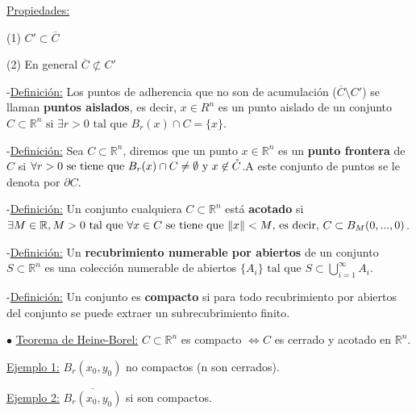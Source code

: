\documentclass[10pt, titlepage]{article}
\newcommand{\R}{\mathbb{R}}
\newcommand{\definicion}{\noindent-\underline{Definición:} }
\newcommand{\teorema}[1][\!\!]{\noindent$\bullet$ \underline{Teorema #1:} }
\begin{document}
\underline{Propiedades:}
\vspace{3mm}

\indent \indent (1) $C' \subset \overline{C}$
\vspace{3mm}

\indent \indent (2) En general $\overline{C} \not\subset C'$
\vspace{5mm}

\definicion Los puntos de adherencia que no son de acumulación ($\overline{C} \setminus C'$) se llaman 
\textbf{puntos aislados}, es decir, $x \in R^n$ es un punto aislado de un conjunto$ C \subset \R^n 
\text{ si } \exists{r > 0} \text{ tal que } B_r (x) \cap C = \{x\}$.
\vspace{7mm}

\definicion Sea $C \subset \R^n$, diremos que un punto $x \in \R^n$ es un \textbf{punto frontera} de $C$ 
si $\forall{r > 0} \text{ se tiene que } \\ B_r (x) \cap C \neq \emptyset \text{ y } x \not\in \mathring{C}$.A 
este conjunto de puntos se le denota por $\partial C$.
\vspace{7mm}

\definicion Un conjunto cualquiera $C \subset \R^n$ está \textbf{acotado} si $\exists{M \in \R}, M > 0 
\text{ tal que } \forall{x \in C} \text{ se tiene que } \\ \|x\| < M \text{, es decir, } C \subset B_M (0,..., 0)$.
\vspace{7mm}

\definicion Un \textbf{recubrimiento numerable por abiertos} de un conjunto $S 
\subset \R^n$ es una colección numerable de abiertos $\{A_i\} \text{ tal que } S \subset \displaystyle 
\bigcup_{i=1}^\infty A_i$.
\vspace{5mm}

\definicion Un conjunto es \textbf{compacto} si para todo recubrimiento por abiertos 
del conjunto se puede extraer un subrecubrimiento finito.
\vspace{5mm}


\teorema[de Heine-Borel]$C \subset \R^n$ es compacto $\iff C$ es cerrado 
y acotado en $\R^n$.
\vspace{5mm}

\underline{Ejemplo 1:} $B_r (x_0, y_0)$ no compactos (n son cerrados).
\vspace{5mm}

\underline{Ejemplo 2:} $\overline{B_r (x_0, y_0)}$ si son compactos.
\vspace{5mm}
\end{document}

